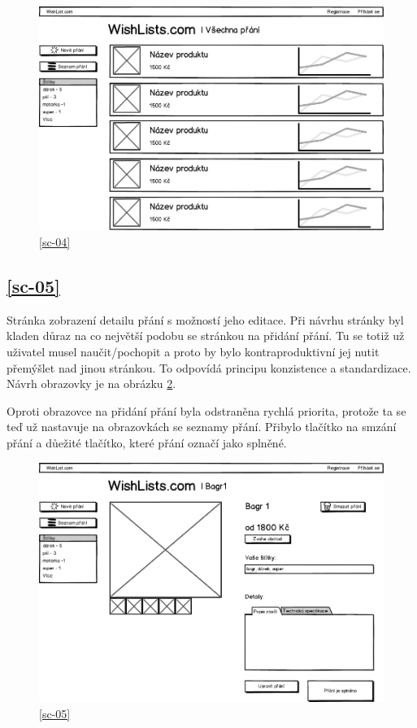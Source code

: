 \begin{figure}[htb]
\begin{center}
\includegraphics[width=130mm]{./pictures/mock/vsechna-prani.png}
\caption{\ref{sc-04}}
\label{fig:vsechna-prani}
\end{center}
\end{figure}

\subsection{\ref{sc-05}}
Stránka zobrazení detailu přání s možností jeho editace. Při návrhu stránky byl kladen důraz na co největší podobu se stránkou na přidání přání. Tu se totiž už uživatel musel naučit/pochopit a proto by bylo kontraproduktivní jej nutit přemýšlet nad jinou stránkou. To odpovídá principu konzistence a standardizace\cite{molich1990improving}. Návrh obrazovky je na obrázku \ref{fig:editace-detail-prani}.

Oproti obrazovce na přidání přání byla odstraněna rychlá priorita, protože ta se teď už nastavuje na obrazovkách se seznamy přání. Přibylo tlačítko na smzání přání a důežité tlačítko, které přání označí jako splněné.

\begin{figure}[htb]
\begin{center}
\includegraphics[width=130mm]{./pictures/mock/editace-detail-prani.png}
\caption{\ref{sc-05}}
\label{fig:editace-detail-prani}
\end{center}
\end{figure}

